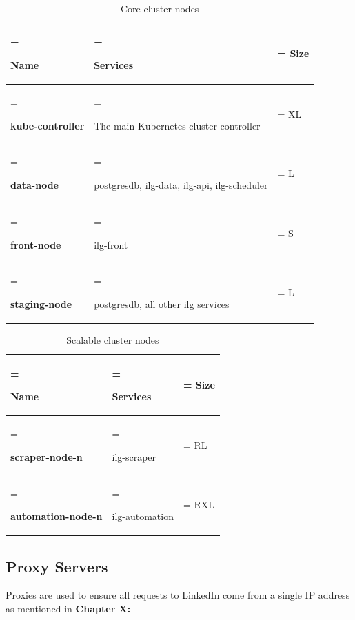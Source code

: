 \begin{table}[H]
    \renewcommand{\arraystretch}{1.5} %
    \caption{Core cluster nodes}
    \centering
    \medskip
    \begin{tabularx}{1\textwidth} {
            | >{\hsize=1\hsize\linewidth=\hsize\raggedright\arraybackslash}X
            | >{\hsize=1.8\hsize\linewidth=\hsize\raggedright\arraybackslash}X
            | >{\hsize=0.2\hsize\linewidth=\hsize\centering\arraybackslash}X |}
        \hline
        \rowcolor{primary} \textbf{Name} & \textbf{Services}                            & \textbf{Size} \\
        \hline
        \textbf{kube-controller}         & The main Kubernetes cluster controller       & XL            \\
        \hline
        \textbf{data-node}               & postgresdb, ilg-data, ilg-api, ilg-scheduler & L             \\
        \hline
        \textbf{front-node}              & ilg-front                                    & S             \\
        \hline
        \textbf{staging-node}            & postgresdb, all other ilg services           & L             \\
        \hline
    \end{tabularx}
\end{table}

\begin{table}[H]
    \renewcommand{\arraystretch}{1.5} %
    \caption{Scalable cluster nodes}
    \centering
    \medskip
    \begin{tabularx}{1\textwidth} {
            | >{\hsize=1.2\hsize\linewidth=\hsize\raggedright\arraybackslash}X
            | >{\hsize=1.5\hsize\linewidth=\hsize\raggedright\arraybackslash}X
            | >{\hsize=0.3\hsize\linewidth=\hsize\centering\arraybackslash}X |}
        \hline
        \rowcolor{primary} \textbf{Name} & \textbf{Services} & \textbf{Size} \\
        \hline
        \textbf{scraper-node-n}          & ilg-scraper       & RL            \\
        \hline
        \textbf{automation-node-n}       & ilg-automation    & RXL           \\
        \hline
    \end{tabularx}
\end{table}

\subsection{Proxy Servers}
Proxies are used to ensure all requests to LinkedIn come from a single IP address as mentioned in \textbf{Chapter X: ---}

